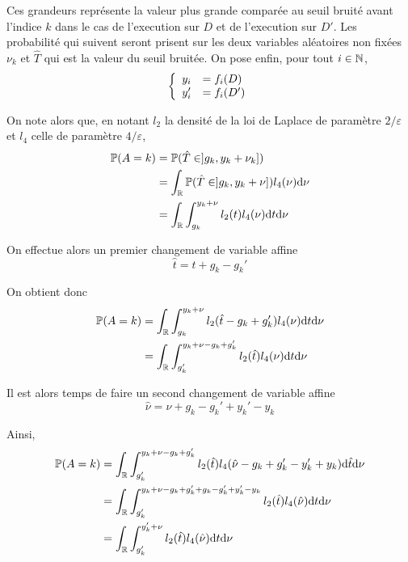 Ces grandeurs représente la valeur plus grande comparée au seuil bruité avant l'indice \(k\) dans le cas de l'execution sur \(D\) et de l'execution sur \(D'\). Les probabilité qui suivent seront prisent sur les deux variables aléatoires non fixées \(\nu_k\) et \(\hat T\) qui est la valeur du seuil bruitée. On pose enfin, pour tout \(i \in \mathbb{N}\),
\[
    \left\{ 
        \begin{array}[]{rl}
            y_i & = f_i(D)\\
            y_i' & = f_i(D')\\
        \end{array}
    \right.    
\]


On note alors que, en notant \(l_2\) la densité de la loi de {\sc Laplace} de paramètre \(2/\varepsilon\) et \(l_4\) celle de paramètre \(4/\varepsilon\),
\begin{align*}
    \mathbb P(A = k) & = \mathbb P(\hat T \in ]g_k, y_k + \nu_k])\\
    & = \int_{\mathbb{R}} \mathbb P(\hat T \in ]g_k, y_k + \nu])l_4(\nu) \mathrm{d} \nu \\
    & = \int_{\mathbb{R}}\int_{g_k}^{y_k + \nu} l_2(t)l_4(\nu) \mathrm{d} t \mathrm{d} \nu 
\end{align*}

On effectue alors un premier changement de variable affine 
\[
    \hat t = t + g_k - g_k'    
\]

On obtient donc 
\begin{align*}
    \mathbb P(A = k) & = \int_{\mathbb{R}}\int_{g_k}^{y_k + \nu} l_2(\hat t - g_k + g_k')l_4(\nu) \mathrm{d}  t \mathrm{d} \nu\\
    & = \int_{\mathbb{R}}\int_{g_k'}^{y_k + \nu - g_k + g_k'} l_2(\hat t )l_4(\nu) \mathrm{d}  t \mathrm{d} \nu\\
\end{align*}

Il est alors temps de faire un second changement de variable affine
\[
    \hat \nu = \nu + g_k - g_k' + y_k' - y_k   
\]

Ainsi,
\begin{align*}
    \mathbb P(A = k) & = \int_{\mathbb{R}}\int_{g_k'}^{y_k + \nu - g_k + g_k' } l_2(\hat t )l_4(\hat\nu - g_k + g_k' - y_k' + y_k) \mathrm{d} \hat t \mathrm{d} \nu\\
    & = \int_{\mathbb{R}}\int_{g_k'}^{y_k + \nu  - g_k +g_k'  + g_k - g_k' +y_k' - y_k} l_2(\hat t )l_4(\hat\nu) \mathrm{d}  t \mathrm{d} \nu\\
    & = \int_{\mathbb{R}}\int_{g_k'}^{y_k' + \nu } l_2(\hat t )l_4(\hat\nu) \mathrm{d} t \mathrm{d} \nu\\
\end{align*}

